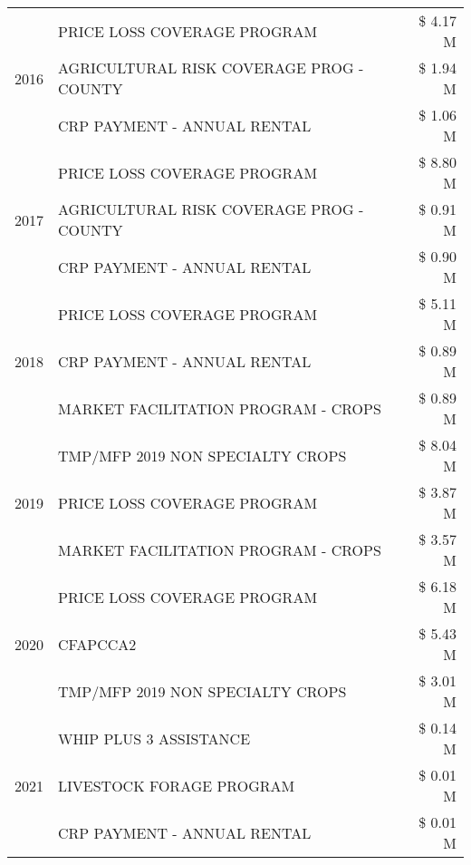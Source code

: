 \begin{tabular}{llr}
\multirow[t]{3}{*}{2016} & PRICE LOSS COVERAGE PROGRAM & \$ 4.17 M \\
 & AGRICULTURAL RISK COVERAGE PROG - COUNTY & \$ 1.94 M \\
 & CRP PAYMENT - ANNUAL RENTAL & \$ 1.06 M \\
\cline{1-3}
\multirow[t]{3}{*}{2017} & PRICE LOSS COVERAGE PROGRAM & \$ 8.80 M \\
 & AGRICULTURAL RISK COVERAGE PROG - COUNTY & \$ 0.91 M \\
 & CRP PAYMENT - ANNUAL RENTAL & \$ 0.90 M \\
\cline{1-3}
\multirow[t]{3}{*}{2018} & PRICE LOSS COVERAGE PROGRAM & \$ 5.11 M \\
 & CRP PAYMENT - ANNUAL RENTAL & \$ 0.89 M \\
 & MARKET FACILITATION PROGRAM - CROPS & \$ 0.89 M \\
\cline{1-3}
\multirow[t]{3}{*}{2019} & TMP/MFP 2019 NON SPECIALTY CROPS & \$ 8.04 M \\
 & PRICE LOSS COVERAGE PROGRAM & \$ 3.87 M \\
 & MARKET FACILITATION PROGRAM - CROPS & \$ 3.57 M \\
\cline{1-3}
\multirow[t]{3}{*}{2020} & PRICE LOSS COVERAGE PROGRAM & \$ 6.18 M \\
 & CFAPCCA2 & \$ 5.43 M \\
 & TMP/MFP 2019 NON SPECIALTY CROPS & \$ 3.01 M \\
\cline{1-3}
\multirow[t]{3}{*}{2021} & WHIP PLUS 3 ASSISTANCE & \$ 0.14 M \\
 & LIVESTOCK FORAGE PROGRAM & \$ 0.01 M \\
 & CRP PAYMENT - ANNUAL RENTAL & \$ 0.01 M \\
\cline{1-3}
\bottomrule
\end{tabular}

